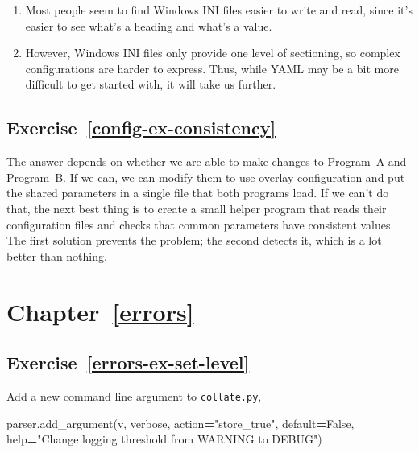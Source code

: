 \documentclass[
]{krantz}
\makeatletter
\newenvironment{Shaded}{\begin{snugshade}}{\end{snugshade}}
\newcommand{\BuiltInTok}[1]{#1}
\newcommand{\NormalTok}[1]{#1}
\newcommand{\OperatorTok}[1]{\textcolor[rgb]{0.81,0.36,0.00}{\textbf{#1}}}
\newcommand{\StringTok}[1]{\textcolor[rgb]{0.31,0.60,0.02}{#1}}
\newcommand{\VariableTok}[1]{\textcolor[rgb]{0.00,0.00,0.00}{#1}}
\newenvironment{kframe}{%
\medskip{}
\setlength{\fboxsep}{.8em}
 \def\at@end@of@kframe{}%
 \ifinner\ifhmode%
  \def\at@end@of@kframe{\end{minipage}}%
  \begin{minipage}{\columnwidth}%
 \fi\fi%
 \def\FrameCommand##1{\hskip\@totalleftmargin \hskip-\fboxsep
 \colorbox{shadecolor}{##1}\hskip-\fboxsep
     \hskip-\linewidth \hskip-\@totalleftmargin \hskip\columnwidth}%
 \MakeFramed {\advance\hsize-\width
   \@totalleftmargin\z@ \linewidth\hsize
   \@setminipage}}%
 {\par\unskip\endMakeFramed%
 \at@end@of@kframe}
\renewenvironment{Shaded}{\begin{kframe}}{\end{kframe}}
\makeatother
\begin{document}
\begin{enumerate}
\def\labelenumi{\arabic{enumi}.}
\item
  Most people seem to find Windows INI files easier to write and read,
  since it's easier to see what's a heading and what's a value.
\item
  However, Windows INI files only provide one level of sectioning,
  so complex configurations are harder to express.
  Thus, while YAML may be a bit more difficult to get started with,
  it will take us further.
\end{enumerate}

\hypertarget{exercise-refconfig-ex-consistency}{%
\subsection*{Exercise~\ref{config-ex-consistency}}\label{exercise-refconfig-ex-consistency}}


The answer depends on whether we are able to make changes to Program~A and Program~B.
If we can,
we can modify them to use overlay configuration
and put the shared parameters in a single file that both programs load.
If we can't do that,
the next best thing is to create a small helper program
that reads their configuration files and checks that common parameters have consistent values.
The first solution prevents the problem;
the second detects it,
which is a lot better than nothing.

\hypertarget{chapter-referrors}{%
\section*{Chapter~\ref{errors}}\label{chapter-referrors}}

\hypertarget{exercise-referrors-ex-set-level}{%
\subsection*{Exercise~\ref{errors-ex-set-level}}\label{exercise-referrors-ex-set-level}}


Add a new command line argument to \texttt{collate.py},

\begin{Shaded}
\begin{Highlighting}[]
\NormalTok{parser.add\_argument(}\StringTok{\textquotesingle{}{-}v\textquotesingle{}}\NormalTok{, }\StringTok{\textquotesingle{}{-}{-}verbose\textquotesingle{}}\NormalTok{, action}\OperatorTok{=}\StringTok{"store\_true"}\NormalTok{, default}\OperatorTok{=}\VariableTok{False}\NormalTok{,}
                    \BuiltInTok{help}\OperatorTok{=}\StringTok{"Change logging threshold from WARNING to DEBUG"}\NormalTok{)}
\end{Highlighting}
\end{Shaded}
\end{document}
